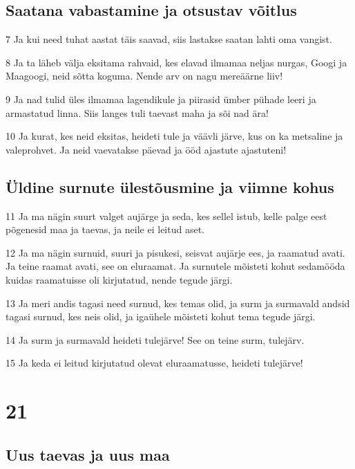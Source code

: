 \section*{Saatana vabastamine ja otsustav võitlus}

\par 7 Ja kui need tuhat aastat täis saavad, siis lastakse saatan lahti oma vangist.
\par 8 Ja ta läheb välja eksitama rahvaid, kes elavad ilmamaa neljas nurgas, Googi ja Maagoogi, neid sõtta koguma. Nende arv on nagu mereäärne liiv!
\par 9 Ja nad tulid üles ilmamaa lagendikule ja piirasid ümber pühade leeri ja armastatud linna. Siis langes tuli taevast maha ja sõi nad ära!
\par 10 Ja kurat, kes neid eksitas, heideti tule ja väävli järve, kus on ka metsaline ja valeprohvet. Ja neid vaevatakse päevad ja ööd ajastute ajastuteni!

\section*{Üldine surnute ülestõusmine ja viimne kohus}

\par 11 Ja ma nägin suurt valget aujärge ja seda, kes sellel istub, kelle palge eest põgenesid maa ja taevas, ja neile ei leitud aset.
\par 12 Ja ma nägin surnuid, suuri ja pisukesi, seisvat aujärje ees, ja raamatud avati. Ja teine raamat avati, see on eluraamat. Ja surnutele mõisteti kohut sedamööda kuidas raamatuisse oli kirjutatud, nende tegude järgi.
\par 13 Ja meri andis tagasi need surnud, kes temas olid, ja surm ja surmavald andsid tagasi surnud, kes neis olid, ja igaühele mõisteti kohut tema tegude järgi.
\par 14 Ja surm ja surmavald heideti tulejärve! See on teine surm, tulejärv.
\par 15 Ja keda ei leitud kirjutatud olevat eluraamatusse, heideti tulejärve!


\chapter{21}

\section*{Uus taevas ja uus maa}


